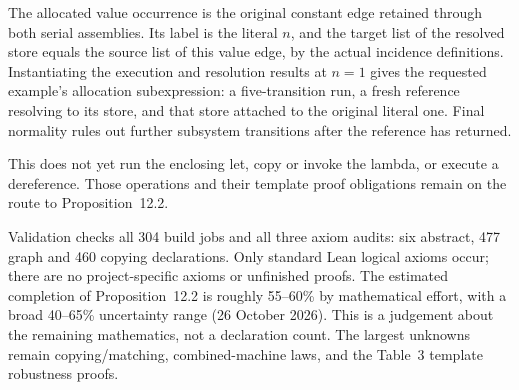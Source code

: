 





The allocated value occurrence is the original constant edge retained
through both serial assemblies. Its label is the literal $n$, and the target
list of the resolved store equals the source list of this value edge, by the
actual incidence definitions. Instantiating the execution and resolution
results at $n=1$ gives the requested example's allocation subexpression:
a five-transition run, a fresh reference resolving to its store, and that
store attached to the original literal one. Final normality rules out further
subsystem transitions after the reference has returned.

This does not yet run the enclosing let, copy or invoke the lambda, or execute
a dereference. Those operations and their template proof obligations remain
on the route to Proposition~12.2.






Validation checks all 304 build jobs and all three axiom audits: six
abstract, 477 graph and 460 copying declarations. Only standard Lean logical
axioms occur; there are no project-specific axioms or unfinished proofs.
The estimated completion of Proposition~12.2 is roughly 55--60\% by mathematical
effort, with a broad 40--65\% uncertainty range (26 October 2026). This is a
judgement about the remaining mathematics, not a declaration count. The
largest unknowns remain copying/matching, combined-machine laws, and the
Table~3 template robustness proofs.


